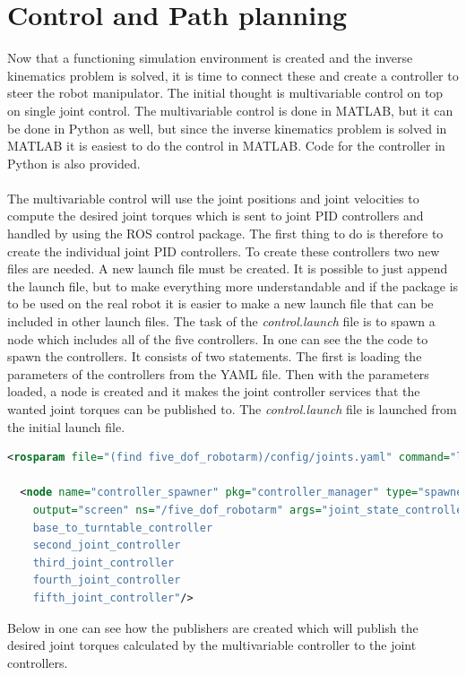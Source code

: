 \chapter{Control and Path planning}
Now that a functioning simulation environment is created and the inverse kinematics problem is solved, it is time to connect these and create a controller to steer the robot manipulator. The initial thought is multivariable control on top on single joint control. The multivariable control is done in MATLAB, but it can be done in Python as well, but since the inverse kinematics problem is solved in MATLAB it is easiest to do the control in MATLAB. Code for the controller in Python is also provided. \\\\
The multivariable control will use the joint positions and joint velocities to compute the desired joint torques which is sent to joint PID controllers and handled by using the ROS control package\cite{ROScontrol}. The first thing to do is therefore to create the individual joint PID controllers. To create these controllers two new files are needed. A new launch file must be created. It is possible to just append the launch file, but to make everything more understandable and if the package is to be used on the real robot it is easier to make a new launch file that can be included in other launch files. The task of the \textit{control.launch} file is to spawn a node which includes all of the five controllers. In  one can see the the code to spawn the controllers. It consists of two statements. The first is loading the parameters of the controllers from the YAML file. Then with the parameters loaded, a node is created and it makes the joint controller services that the wanted joint torques can be published to. The \textit{control.launch} file is launched from the initial launch file.
\begin{lstlisting}[language=xml,caption={Spawns the controller node},label={lst:launchControl}]
<rosparam file="(find five_dof_robotarm)/config/joints.yaml" command="load"/>

  <node name="controller_spawner" pkg="controller_manager" type="spawner" respawn="false"
	output="screen" ns="/five_dof_robotarm" args="joint_state_controller
    base_to_turntable_controller
    second_joint_controller
    third_joint_controller
    fourth_joint_controller
    fifth_joint_controller"/>
\end{lstlisting}
Below in  one can see how the publishers are created which will publish the desired joint torques calculated by the multivariable controller to the joint controllers.
